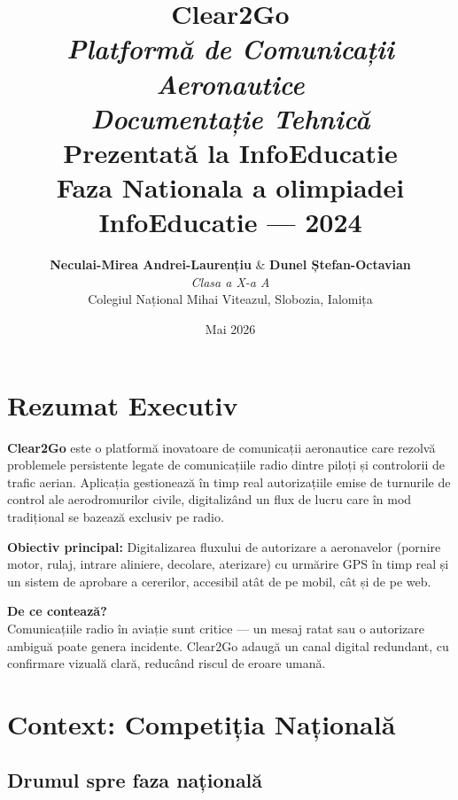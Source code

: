 \documentclass[11pt,a4paper]{report}
\title{
    \vspace{2cm}
    \Huge \textbf{Clear2Go}\\[0.5em]
    \Large \textit{Platformă de Comunicații Aeronautice}\\[0.3em]
    \normalsize \textit{Documentație Tehnică}\\[2em]
    \large \textbf{\textcolor{blue!70!black}{Prezentată la InfoEducatie}}\\[0.3em]
    \normalsize Faza Nationala a olimpiadei InfoEducatie — 2024
}
\author{
    \textbf{Neculai-Mirea Andrei-Laurențiu} \& \textbf{Dunel Ștefan-Octavian}\\[0.3em]
    \textit{Clasa a X-a A}\\
    Colegiul Național Mihai Viteazul, Slobozia, Ialomița
}
\date{Mai 2026}
\begin{document}
\maketitle
\thispagestyle{empty}

\vspace{3cm}


\newpage
\tableofcontents
\newpage

\chapter{Rezumat Executiv}

\textbf{Clear2Go} este o platformă inovatoare de comunicații aeronautice care rezolvă
problemele persistente legate de comunicațiile radio dintre piloți și controlorii de
trafic aerian. Aplicația gestionează în timp real autorizațiile emise de turnurile de
control ale aerodromurilor civile, digitalizând un flux de lucru care în mod tradițional
se bazează exclusiv pe radio.

\vspace{0.5em}

\textbf{Obiectiv principal:} Digitalizarea fluxului de autorizare a aeronavelor
(pornire motor, rulaj, intrare aliniere, decolare, aterizare) cu urmărire GPS în timp
real și un sistem de aprobare a cererilor, accesibil atât de pe mobil, cât și de pe web.

\vspace{0.5em}

\begin{mdframed}[backgroundcolor=green!5, linecolor=green!60!black, linewidth=1pt]
\textbf{De ce contează?} \\
Comunicațiile radio în aviație sunt critice — un mesaj ratat sau o autorizare
ambiguă poate genera incidente. Clear2Go adaugă un canal digital redundant, cu
confirmare vizuală clară, reducând riscul de eroare umană.
\end{mdframed}

\chapter{Context: Competiția Națională}

\section{Drumul spre faza națională}
\end{document}
